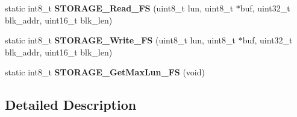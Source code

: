 \begin{DoxyCompactItemize}
static int8\+\_\+t {\bfseries S\+T\+O\+R\+A\+G\+E\+\_\+\+Read\+\_\+\+FS} (uint8\+\_\+t lun, uint8\+\_\+t $\ast$buf, uint32\+\_\+t blk\+\_\+addr, uint16\+\_\+t blk\+\_\+len)
\item 
\mbox{\label{group___u_s_b_d___s_t_o_r_a_g_e___private___function_prototypes_ga45de5935af5e01badbe2b335f15d7bde}} 
static int8\+\_\+t {\bfseries S\+T\+O\+R\+A\+G\+E\+\_\+\+Write\+\_\+\+FS} (uint8\+\_\+t lun, uint8\+\_\+t $\ast$buf, uint32\+\_\+t blk\+\_\+addr, uint16\+\_\+t blk\+\_\+len)
\item 
\mbox{\label{group___u_s_b_d___s_t_o_r_a_g_e___private___function_prototypes_ga39a7866cba8ea5a5a244bffc30343eb0}} 
static int8\+\_\+t {\bfseries S\+T\+O\+R\+A\+G\+E\+\_\+\+Get\+Max\+Lun\+\_\+\+FS} (void)
\end{DoxyCompactItemize}


\subsection{Detailed Description}
